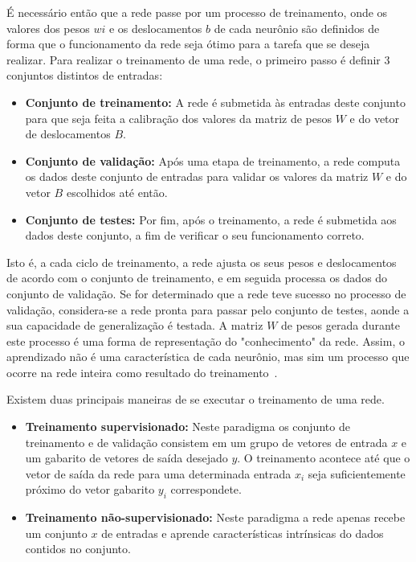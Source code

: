 É necessário então que a rede passe por um processo de treinamento, onde os valores dos pesos $wi$ e os deslocamentos $b$ de cada neurônio são definidos de forma que o funcionamento da rede seja ótimo para a tarefa que se deseja realizar. Para realizar o treinamento de uma rede, o primeiro passo é definir 3 conjuntos distintos de entradas:

\begin{itemize}
	\item \textbf{Conjunto de treinamento:} A rede é submetida às entradas deste conjunto para que seja feita a calibração dos valores da matriz de pesos $W$ e do vetor de deslocamentos $B$.
	
	\item \textbf{Conjunto de validação:} Após uma etapa de treinamento, a rede computa os dados deste conjunto de entradas para validar os valores da matriz $W$ e do vetor $B$ escolhidos até então.
	
	\item \textbf{Conjunto de testes:} Por fim, após o treinamento, a rede é submetida aos dados deste conjunto, a fim de verificar o seu funcionamento correto.
\end{itemize}

Isto é, a cada ciclo de treinamento, a rede ajusta os seus pesos e deslocamentos de acordo com o conjunto de treinamento, e em seguida processa os dados do conjunto de validação. Se for determinado que a rede teve sucesso no processo de validação, considera-se a rede pronta para passar pelo conjunto de testes, aonde a sua capacidade de generalização é testada. A matriz $W$ de pesos gerada durante este processo é uma forma de representação do "conhecimento" da rede. Assim, o aprendizado não é uma característica de cada neurônio, mas sim um processo que ocorre na rede inteira como resultado do treinamento~\cite{Kosabov}.

Existem duas principais maneiras de se executar o treinamento de uma rede.

\begin{itemize}
	\item \textbf{Treinamento supervisionado:} Neste paradigma os conjunto de treinamento e de validação consistem em um grupo de vetores de entrada $x$ e um gabarito de vetores de saída desejado $y$. O treinamento acontece até que o vetor de saída da rede para uma determinada entrada $x_i$ seja suficientemente próximo do vetor gabarito $y_i$ correspondete.
	
	
	\item \textbf{Treinamento não-supervisionado:} Neste paradigma a rede apenas recebe um conjunto $x$ de entradas e aprende características intrínsicas do dados contidos no conjunto.
	
\end{itemize}

